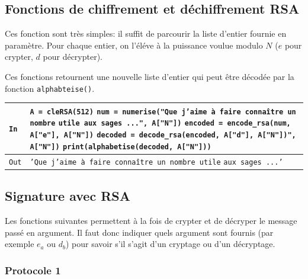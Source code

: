 \documentclass[titlepage]{article}
\begin{document}
    \subsection{Fonctions de chiffrement et déchiffrement RSA}
    Ces fonction sont très simples: il suffit de parcourir la liste d'entier fournie en paramètre. Pour chaque entier, on l'éléve à la puissance voulue modulo $N$ ($e$ pour crypter, $d$ pour décrypter).

    

    

    Ces fonctions retournent une nouvelle liste d'entier qui peut être décodée par la fonction \texttt{alphabteise()}.

    \begin{tabularx}{12cm}{|p{0.60cm}|X|}
        \hline
        \rowcolor{gray} \texttt{In} & \texttt{A = cleRSA(512)} \newline
        \texttt{num = numerise("Que j’aime à faire connaître un nombre}\newline
        \texttt{utile aux sages ...", A["N"])} \newline
        \texttt{encoded = encode\_rsa(num, A["e"], A["N"])} \newline
        \texttt{decoded = decode\_rsa(encoded, A["d"], A["N"])", A["N"])} \newline
        \texttt{print(alphabetise(decoded, A["N"]))} \\
        \hline
        \texttt{Out} & \texttt{'Que j’aime à faire connaître un nombre utile} \newline
        \texttt{aux sages ...'} \\
        \hline
    \end{tabularx}
    \bigbreak

    \subsection{Signature avec RSA}
    Les fonctions suivantes permettent à la fois de crypter et de décryper le message passé en argument.
    Il faut donc indiquer quels argument sont fournis (par exemple $e_a$ ou $d_b$) pour savoir s'il s'agit d'un cryptage ou d'un décryptage.
    \subsubsection{Protocole 1}
\end{document}
